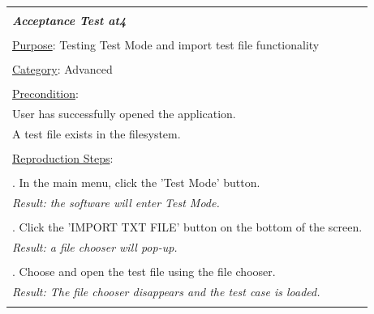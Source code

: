 \documentclass[fontsize=12pt,paper=letter,twoside]{scrartcl}
\begin{document}
\begin{table}[!h]
	\begin{tabular}{|l|}
		\hline
		\\
		\textbf{\emph{Acceptance Test at4}} 	
		\\\\
		\underline{Purpose}: Testing Test Mode and import test file functionality \\
		\\
		\underline{Category}: Advanced		\\
		\\
		\underline{Precondition}:															\\ \qquad
		User has successfully opened the application.
		\\ \qquad
		A test file exists in the filesystem.
		\\\\
		\underline{Reproduction Steps}:				
		\\\\ \qquad 1. In the main menu, click the 'Test Mode' button.
		\\ \qquad \textit{Result: the software will enter Test Mode.} 
		\\\\ \qquad 2. Click the 'IMPORT TXT FILE' button on the bottom of the screen.
		\\ \qquad \textit{Result: a file chooser will pop-up.} 
		\\\\ \qquad 3. Choose and open the test file using the file chooser.
		\\ \qquad \textit{Result: The file chooser disappears and the test case is loaded.} 
		\\\\
		\hline
	\end{tabular}
\end{table}

\newpage
\end{document}
